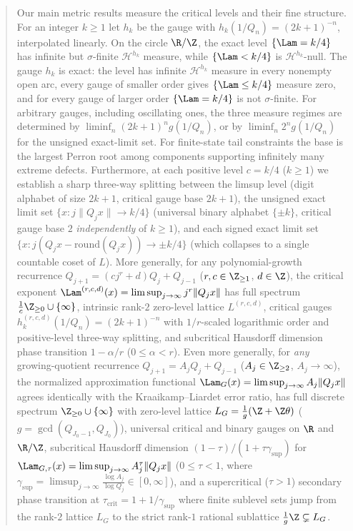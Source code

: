 \begin{abstract}
Our main metric results measure the critical levels and their fine structure.
For an integer $k\ge1$ let $h_k$ be the gauge with $h_k(1/Q_n)=(2k+1)^{-n}$,
interpolated linearly. On the circle $\R/\Z$, the exact level $\{\Lam=k/4\}$
has infinite but $\sigma$-finite $\mathcal H^{h_k}$ measure, while
$\{\Lam<k/4\}$ is $\mathcal H^{h_k}$-null. The gauge $h_k$ is exact: the level
has infinite $\mathcal H^{h_k}$ measure in every nonempty open arc, every gauge
of smaller order gives $\{\Lam\le k/4\}$ measure zero, and for every gauge of
larger order $\{\Lam=k/4\}$ is not $\sigma$-finite. For arbitrary gauges,
including oscillating ones, the three measure regimes are determined by
$\liminf_n (2k+1)^n g(1/Q_n)$, or by $\liminf_n 2^n g(1/Q_n)$ for the
unsigned exact-limit set. For finite-state tail constraints the base is
the largest Perron root among components supporting infinitely many
extreme defects. Furthermore, at each
positive level $c=k/4$ ($k\ge1$) we establish a sharp three-way splitting
between the limsup level (digit alphabet of size $2k+1$, critical gauge base
$2k+1$), the unsigned exact limit set $\{x:j\|Q_jx\|\to k/4\}$ (universal binary
alphabet $\{\pm k\}$, critical gauge base $2$ \emph{independently} of
$k\ge1$), and each signed exact limit set
$\{x:j(Q_jx-\mathrm{round}(Q_jx))\to\pm k/4\}$ (which collapses to a single
countable coset of $L$). More generally, for any polynomial-growth recurrence
$Q_{j+1}=(cj^r+d)Q_j+Q_{j-1}$ ($r,c\in\Z_{\ge1}$, $d\in\Z$), the critical
exponent $\Lam^{(r,c,d)}(x)=\limsup_{j\to\infty}j^r\|Q_jx\|$ has full
spectrum $\frac1c\Z_{\ge0}\cup\{\infty\}$, intrinsic rank-$2$ zero-level
lattice $L^{(r,c,d)}$, critical gauges $h_k^{(r,c,d)}(1/Q_n)=(2k+1)^{-n}$
with $1/r$-scaled logarithmic order and positive-level three-way splitting, and
subcritical Hausdorff dimension phase transition $1-\alpha/r$ ($0\le\alpha<r$).
Even more generally, for \emph{any} growing-quotient recurrence
$Q_{j+1}=A_jQ_j+Q_{j-1}$ ($A_j\in\Z_{\ge2}$, $A_j\to\infty$), the normalized
approximation functional $\Lam_G(x)=\limsup_{j\to\infty}A_j\|Q_jx\|$ agrees
identically with the Kraaikamp--Liardet error ratio, has full discrete spectrum
$\Z_{\ge0}\cup\{\infty\}$ with zero-level lattice $L_G=\frac{1}{g}(\Z+\Z\theta)$
($g=\gcd(Q_{J_0-1},Q_{J_0})$), universal critical and binary gauges on $\R$ and
$\R/\Z$, subcritical Hausdorff dimension $(1-\tau)/(1+\tau\gamma_{\sup})$ for
$\Lam_{G,\tau}(x)=\limsup_{j\to\infty}A_j^\tau\|Q_jx\|$ ($0\le\tau<1$, where
$\gamma_{\sup}=\limsup_{j\to\infty}\frac{\log A_j}{\log Q_j}\in[0,\infty]$),
and a supercritical ($\tau>1$) secondary phase transition at
$\tau_{\mathrm{crit}}=1+1/\gamma_{\sup}$ where finite sublevel sets jump from
the rank-$2$ lattice $L_G$ to the strict rank-$1$ rational sublattice
$\frac{1}{g}\Z\subsetneq L_G$.


\end{abstract}
